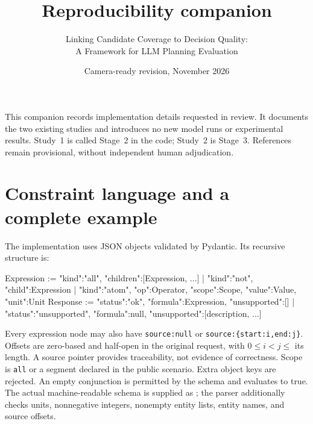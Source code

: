 \documentclass[11pt,a4paper]{scrartcl}
\title{Reproducibility companion}
\subtitle{Linking Candidate Coverage to Decision Quality:\\A Framework for LLM Planning Evaluation}
\author{}
\date{Camera-ready revision, November 2026}
\begin{document}
\maketitle
\noindent This companion records implementation details requested in review. It documents the two existing studies and introduces no new model runs or experimental results. Study~1 is called Stage~2 in the code; Study~2 is Stage~3. References remain provisional, without independent human adjudication.

\section{Constraint language and a complete example}
The implementation uses JSON objects validated by Pydantic. Its recursive structure is:
\begin{Code}
Expression := {"kind":"all", "children":[Expression, ...]}
            | {"kind":"not", "child":Expression}
            | {"kind":"atom", "op":Operator,
               "scope":Scope, "value":Value, "unit":Unit}
Response   := {"status":"ok", "formula":Expression,
               "unsupported":[]}
            | {"status":"unsupported", "formula":null,
               "unsupported":[description, ...]}
\end{Code}
Every expression node may also have \texttt{source:null} or \texttt{source:\{start:i,end:j\}}. Offsets are zero-based and half-open in the original request, with $0\leq i<j\leq$ its length. A source pointer provides traceability, not evidence of correctness. Scope is \texttt{all} or a segment declared in the public scenario. Extra object keys are rejected. An empty conjunction is permitted by the schema and evaluates to true. The actual machine-readable schema is supplied as ; the parser additionally checks units, nonnegative integers, nonempty entity lists, entity names, and source offsets.
\end{document}
